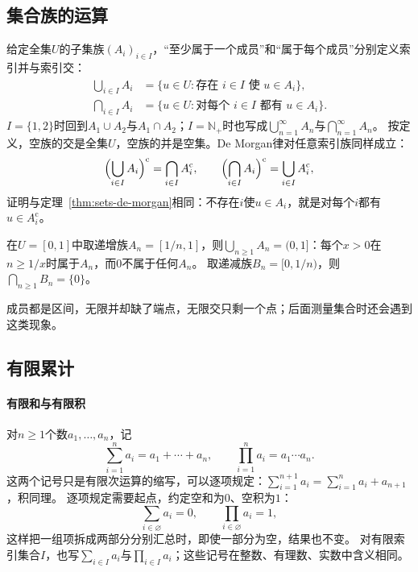 \subsection{集合族的运算}
\label{sec:prelim-indexed-set-operations}

给定全集$U$的子集族$(A_i)_{i\in I}$，“至少属于一个成员”和“属于每个成员”分别定义索引并与索引交：
\[
 \begin{aligned}
  \bigcup_{i\in I}A_i&=\{u\in U:\text{存在 }i\in I\text{ 使 }u\in A_i\},\\
  \bigcap_{i\in I}A_i&=\{u\in U:\text{对每个 }i\in I\text{ 都有 }u\in A_i\}.
 \end{aligned}
\]
$I=\{1,2\}$时回到$A_1\cup A_2$与$A_1\cap A_2$；$I=\mathbb N_+$时也写成$\bigcup_{n=1}^\infty A_n$与$\bigcap_{n=1}^\infty A_n$。
按定义，空族的交是全集$U$，空族的并是空集。De Morgan律对任意索引族同样成立：
\begin{equation}
 \Bigl(\bigcup_{i\in I}A_i\Bigr)^{\mathrm c}=\bigcap_{i\in I}A_i^{\mathrm c},\qquad
 \Bigl(\bigcap_{i\in I}A_i\Bigr)^{\mathrm c}=\bigcup_{i\in I}A_i^{\mathrm c},
 \label{eq:prelim-de-morgan-families}
\end{equation}
证明与定理~\ref{thm:sets-de-morgan}相同：不存在$i$使$u\in A_i$，就是对每个$i$都有$u\in A_i^{\mathrm c}$。

\begin{example}[区间族的无限并与无限交]
\label{ex:sets-interval-family-limits}
在$U=[0,1]$中取递增族$A_n=[1/n,1]$，则$\bigcup_{n\geq1}A_n=(0,1]$：每个$x>0$在$n\geq1/x$时属于$A_n$，而$0$不属于任何$A_n$。
取递减族$B_n=[0,1/n)$，则$\bigcap_{n\geq1}B_n=\{0\}$。
\end{example}
成员都是区间，无限并却缺了端点，无限交只剩一个点；后面测量集合时还会遇到这类现象。

\subsection{有限累计}
\label{sec:prelim-finite-sums-products}

\paragraph{有限和与有限积}
对$n\geq1$个数$a_1,\ldots,a_n$，记
\[
 \sum_{i=1}^{n}a_i=a_1+\cdots+a_n,\qquad \prod_{i=1}^{n}a_i=a_1\cdots a_n.
\]
这两个记号只是有限次运算的缩写，可以逐项规定：$\sum_{i=1}^{n+1}a_i=\sum_{i=1}^na_i+a_{n+1}$，积同理。
逐项规定需要起点，约定空和为$0$、空积为$1$：
\[
 \sum_{i\in\varnothing}a_i=0,\qquad \prod_{i\in\varnothing}a_i=1,
\]
这样把一组项拆成两部分分别汇总时，即使一部分为空，结果也不变。
对有限索引集合$I$，也写$\sum_{i\in I}a_i$与$\prod_{i\in I}a_i$；这些记号在整数、有理数、实数中含义相同。

